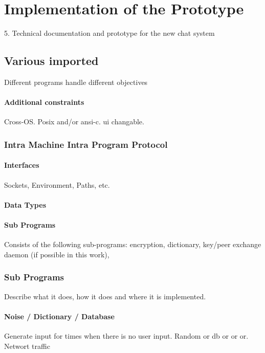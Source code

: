 \chapter{Implementation of the Prototype}

5. Technical documentation and prototype for the new chat system

\section{Various imported}

Different programs handle different objectives
\subsubsection{Additional constraints}
Cross-OS. Posix and/or ansi-c. ui changable.
\subsection{Intra Machine Intra Program Protocol}
\subsubsection{Interfaces}
Sockets, Environment, Paths, etc.
\subsubsection{Data Types}
\subsubsection{Sub Programs}
Consists of the following sub-programs:
encryption, dictionary, key/peer exchange daemon (if possible in this work),
\subsection{Sub Programs}
Describe what it does, how it does and where it is implemented.
\subsubsection{Noise / Dictionary / Database}
Generate input for times when there is no user input.
Random or db or or or.
Networt traffic
